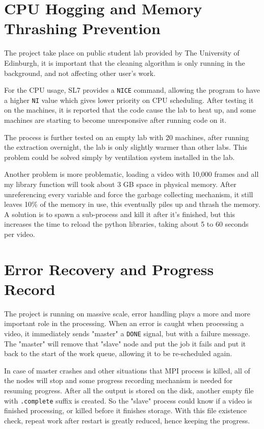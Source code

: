 \documentclass[bsc,logo,twoside,fullspacing,parskip]{infthesis}
\begin{document}
\section{CPU Hogging and Memory Thrashing Prevention}

The project take place on public student lab provided by The University of Edinburgh, it is important that the cleaning algorithm is only running in the background, and not affecting other user's work.

For the CPU usage, SL7 provides a {\tt NICE} command, allowing the program to have a higher {\tt NI} value which gives lower priority on CPU scheduling. After testing it on the machines, it is reported that the code cause the lab to heat up, and some machines are starting to become unresponsive after running code on it.

The process is further tested on an empty lab with 20 machines, after running the extraction overnight, the lab is only slightly warmer than other labs. This problem could be solved simply by ventilation system installed in the lab.

Another problem is more problematic, loading a video with 10,000 frames and all my library function will took about 3 GB space in physical memory. After unreferencing every variable and force the garbage collecting mechanism, it still leaves 10\% of the memory in use, this eventually piles up and thrash the memory. A solution is to spawn a sub-process and kill it after it's finished, but this increases the time to reload the python libraries, taking about 5 to 60 seconds per video.

\section{Error Recovery and Progress Record}

The project is running on massive scale, error handling plays a more and more important role in the processing. When an error is caught when processing a video, it immediately sends "master" a {\tt DONE} signal, but with a failure message. The "master" will remove that "slave" node and put the job it fails and put it back to the start of the work queue, allowing it to be re-scheduled again.

In case of master crashes and other situations that MPI process is killed, all of the nodes will stop and some progress recording mechanism is needed for resuming progress. After all the output is stored on the disk, another empty file with {\tt .complete} suffix is created. So the "slave" process could know if a video is finished processing, or killed before it finishes storage. With this file existence check, repeat work after restart is greatly reduced, hence keeping the progress.
\end{document}
